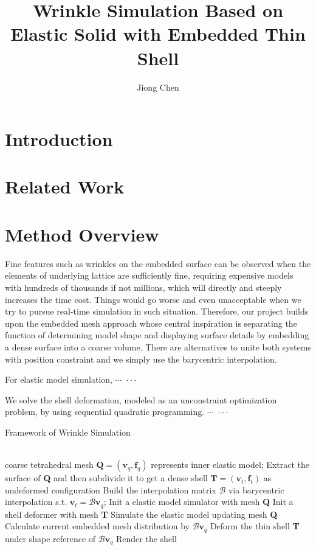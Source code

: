 \documentclass[a4paper,9pt,twocolumn]{extarticle}
\title{Wrinkle Simulation Based on Elastic Solid with Embedded Thin Shell}
\author{Jiong Chen}
\begin{document}
\maketitle

\section{Introduction}

\section{Related Work}

\section{Method Overview}
Fine features such as wrinkles on the embedded surface can be observed when the elements of underlying lattice are sufficiently fine, requiring expensive models with hundreds of thousands if not millions, which will directly and steeply increases the time cost. Things would go worse and even unacceptable when we try to pursue real-time simulation in such situation. Therefore, our project builds upon the embedded mesh approach whose central inspiration is separating the function of determining model shape and displaying surface details by embedding a dense surface into a coarse volume. There are alternatives to unite both systems with position constraint and we simply use the barycentric interpolation.

For elastic model simulation, $\cdots$
$\\\cdots$

We solve the shell deformation, modeled as an unconstraint optimization problem, by using sequential quadratic programming. $\cdots$
$\\\cdots$

\begin{algorithm}[h]
\renewcommand{\algorithmicrequire}{\textbf{Input:}}
\renewcommand\algorithmicensure {\textbf{Output:}}
\caption{Framework of Wrinkle Simulation}
\begin{algorithmic}[1]
\REQUIRE ~~\\
coarse tetrahedral mesh $\textbf{Q}=(\textbf{v}_q,\textbf{f}_q)$ represents inner elastic model;
\STATE Extract the surface of \textbf{Q} and then subdivide it to get a dense shell $\textbf{T}=(\textbf{v}_t,\textbf{f}_t)$ as undeformed configuration
\STATE Build the interpolation matrix $\mathcal{B}$ via barycentric interpolation s.t. $\textbf{v}_t=\mathcal{B}\textbf{v}_q$;
\STATE Init a elastic model simulator with mesh \textbf{Q}
\STATE Init a shell deformer with mesh \textbf{T}
\STATE Simulate the elastic model updating mesh \textbf{Q}
\STATE Calculate current embedded mesh distribution by $\mathcal{B}\textbf{v}_q$
\STATE Deform the thin shell \textbf{T} under shape reference of $\mathcal{B}\textbf{v}_q$
\STATE Render the shell
\ENDFOR
\end{algorithmic}
\end{algorithm}
\end{document}
